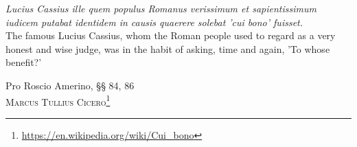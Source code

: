 
\epigraph{\textit{Lucius Cassius ille quem populus Romanus verissimum et sapientissimum iudicem putabat identidem in causis quaerere solebat 'cui bono' fuisset.\\} \vspace{2ex} The famous Lucius Cassius, whom the Roman people used to regard as a very honest and wise judge, was in the habit of asking, time and again, 'To whose benefit?'}{Pro Roscio Amerino, §§ 84, 86\\
  \vspace{-2ex}\textsc{Marcus Tullius Cicero\footnote{\url{https://en.wikipedia.org/wiki/Cui_bono}}}}

